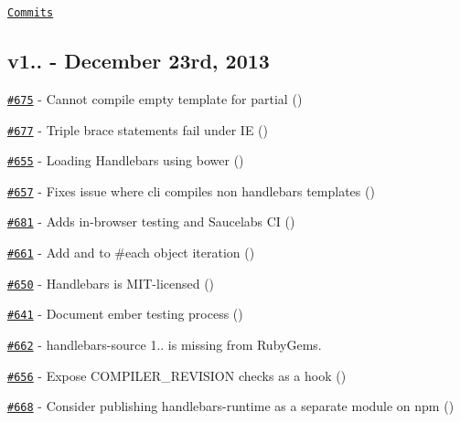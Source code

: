 \href{https://github.com/wycats/handlebars.js/compare/v1.2.0...v1.2.1}{\tt Commits}

\subsection*{v1.. -\/ December 23rd, 2013}


\begin{DoxyItemize}
\item \href{https://github.com/wycats/handlebars.js/issues/675}{\tt \#675} -\/ Cannot compile empty template for partial (\href{https://api.github.com/users/erwinw}{\tt })
\item \href{https://github.com/wycats/handlebars.js/issues/677}{\tt \#677} -\/ Triple brace statements fail under I\+E (\href{https://api.github.com/users/hamzaCM}{\tt })
\item \href{https://github.com/wycats/handlebars.js/issues/655}{\tt \#655} -\/ Loading Handlebars using bower (\href{https://api.github.com/users/niki4810}{\tt })
\item \href{https://github.com/wycats/handlebars.js/pull/657}{\tt \#657} -\/ Fixes issue where cli compiles non handlebars templates (\href{https://api.github.com/users/chrishoage}{\tt })
\item \href{https://github.com/wycats/handlebars.js/pull/681}{\tt \#681} -\/ Adds in-\/browser testing and Saucelabs C\+I (\href{https://api.github.com/users/kpdecker}{\tt })
\item \href{https://github.com/wycats/handlebars.js/pull/661}{\tt \#661} -\/ Add  and  to \#each object iteration (\href{https://api.github.com/users/cgp}{\tt })
\item \href{https://github.com/wycats/handlebars.js/pull/650}{\tt \#650} -\/ Handlebars is M\+I\+T-\/licensed (\href{https://api.github.com/users/thomasboyt}{\tt })
\item \href{https://github.com/wycats/handlebars.js/pull/641}{\tt \#641} -\/ Document ember testing process (\href{https://api.github.com/users/kpdecker}{\tt })
\item \href{https://github.com/wycats/handlebars.js/issues/662}{\tt \#662} -\/ handlebars-\/source 1.. is missing from Ruby\+Gems.
\item \href{https://github.com/wycats/handlebars.js/issues/656}{\tt \#656} -\/ Expose C\+O\+M\+P\+I\+L\+E\+R\+\_\+\+R\+E\+V\+I\+S\+I\+O\+N checks as a hook (\href{https://api.github.com/users/machty}{\tt })
\item \href{https://github.com/wycats/handlebars.js/issues/668}{\tt \#668} -\/ Consider publishing handlebars-\/runtime as a separate module on npm (\href{https://api.github.com/users/dlmanning}{\tt })

\end{DoxyItemize}

